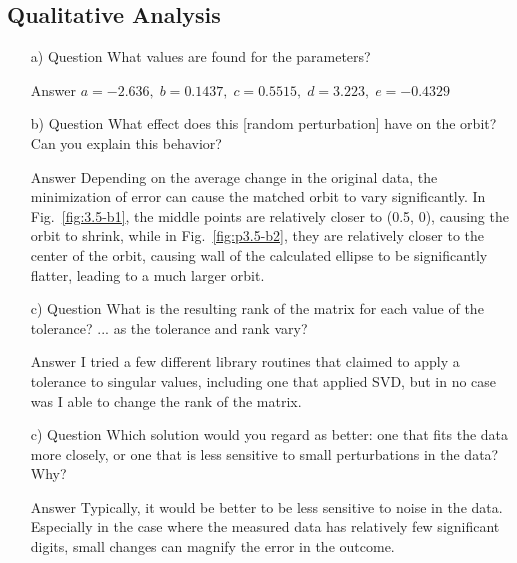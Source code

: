 \documentclass[paper=a4, fontsize=11pt]{scrartcl}
\numberwithin{equation}{section}		%
\numberwithin{figure}{section}			%
\numberwithin{table}{section}				%
\begin{document}
\vspace{4mm}
\subsection{Qualitative Analysis}

\begin{enumerate}[(a)]
	\item[a) Question] What values are found for the parameters? \vspace{-2mm}
		\item[Answer] $a=-2.636, \; b=0.1437, \; c=0.5515, \; d=3.223, \; e=-0.4329$
	\item[b) Question] What effect does this [random perturbation] have on the orbit? Can you explain this behavior? \vspace{-2mm}
		\item[Answer] Depending on the average change in the original data, the minimization of error can cause the matched orbit to vary significantly. In  Fig.~\ref{fig:3.5-b1}, the middle points are relatively closer to (0.5, 0), causing the orbit to shrink, while in Fig.~\ref{fig:p3.5-b2}, they are relatively closer to the center of the orbit, causing wall of the calculated ellipse to be significantly flatter, leading to a much larger orbit.
	\item[c) Question] What is the resulting rank of the matrix for each value of the tolerance? ... as the tolerance and rank vary? \vspace{-2mm}
		\item[Answer] I tried a few different library routines that claimed to apply a tolerance to singular values, including one that applied SVD, but in no case was I able to change the rank of the matrix.
	\item[c) Question] Which solution would you regard as better: one that fits the data more closely, or one that is less sensitive to small perturbations in the data? Why? \vspace{-2mm}
		\item[Answer] Typically, it would be better to be less sensitive to noise in the data. Especially in the case where the measured data has relatively few significant digits, small changes can magnify the error in the outcome.
\end{enumerate}

\vspace{4mm}
\end{document}
